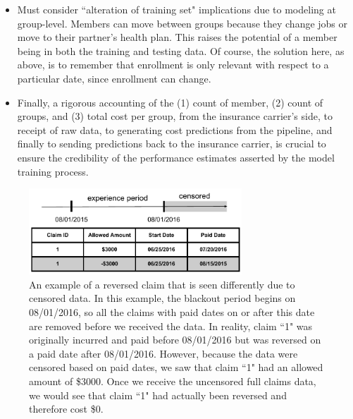 \documentclass[letterpaper]{article} %
\begin{document}
\begin{itemize}
\item Must consider ``alteration of training set" implications due to modeling at group-level. Members can move between groups because they change jobs or move to their partner's health plan. This raises the potential of a member being in both the training and testing data. Of course, the solution here, as above, is to remember that enrollment is only relevant with respect to a particular date, since enrollment can change.
\end{itemize}

\begin{itemize}
\item Finally, a rigorous accounting of the (1) count of member, (2) count of groups, and (3) total cost per group, from the insurance carrier's side, 
to receipt of raw data, to generating cost predictions from the pipeline, and finally to sending predictions back to the insurance carrier, is crucial to 
ensure the credibility of the performance estimates asserted by the model training process.
\end{itemize}

\renewcommand{\thefigure}{A1}

\begin{figure}[!b]
\centering
  \includegraphics[width=8cm]{figure_7.pdf}
  \caption{An example of a reversed claim that is seen differently due to censored data. In this example, the blackout period begins on 08/01/2016, so 
  all the claims with paid dates on or after this date are removed before we received the data. In reality, claim ``1" was originally incurred and paid before 08/01/2016 but was reversed on a paid date after 08/01/2016. However, because the data were censored based on paid dates, we saw that 
  claim ``1" had an allowed amount of \$3000. Once we receive the uncensored full claims data, we would see that claim ``1" had 
  actually been reversed and therefore cost \$0.}
  \label{fig:figDQ}
\end{figure}

\newpage
\end{document}
